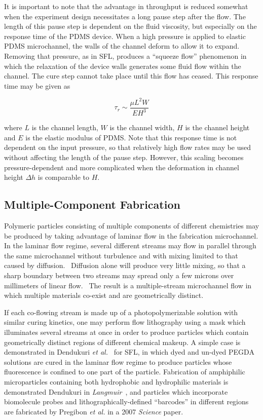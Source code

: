 It is important to note 
that the advantage in throughput is reduced somewhat when the experiment design necessitates a long pause step
after the flow. The length of this pause step is dependent on the fluid viscosity, but especially on the 
response time of the PDMS device.  When a high pressure is applied to elastic PDMS microchannel, the 
walls of the channel deform to allow it to expand.  Removing that pressure, as in SFL, produces a ``squeeze flow''
phenomenon in which the relaxation of the device walls generates some fluid flow within the channel. The cure step 
cannot take place until this flow has ceased.  This response time may be given as

\begin{equation}
\tau_r \sim \frac{\mu L^2 W}{EH^3}
\label{eq:resp-time}
\end{equation}

where $L$ is the channel length, $W$ is the channel width, $H$ is the channel height and $E$ is the elastic
modulus of PDMS.  Note that this response time is not dependent on the input pressure, so that relatively high
flow rates may be used without affecting the length of the pause step. However, this scaling becomes pressure-dependent
and more complicated when the deformation in channel height $\Delta h$ is comparable to $H$.~\cite{dendukuri-sfl}

\subsection{Multiple-Component Fabrication}

Polymeric particles consisting of multiple components of different chemistries may be produced by taking advantage
of laminar flow in the fabrication microchannel.  
In the laminar flow regime, several different streams may flow in parallel through
the same microchannel without turbulence and with mixing limited to that caused by 
diffusion.~\cite{stone-laminar}  Diffusion alone
will produce very little mixing, so that a sharp boundary between two streams may spread only a few microns over
millimeters of linear flow.~\cite{mohr-flow} The result is a multiple-stream microchannel flow in which multiple materials
co-exist and are geometrically distinct.

If each co-flowing stream is made up of a photopolymerizable solution with similar curing kinetics, one may perform
flow lithography using a mask which illuminates several streams at once in order
to produce particles which contain geometrically
distinct regions of different chemical makeup.  A simple case 
is demonstrated in Dendukuri \textit{et al.}~\cite{dendukuri-sfl}
for SFL, in which dyed and un-dyed PEGDA solutions are cured in the laminar flow regime to produce particles whose
fluorescence is confined to one part of the particle.  Fabrication of amphiphilic microparticles containing both
hydrophobic and hydrophilic materials is demonstrated Dendukuri in 
\textit{Langmuir}~\cite{dendukuri-amph}, and particles which incorporate biomolecule probes and lithographically-defined
``barcodes'' in different regions are fabricated by Pregibon \textit{et al.} in a 2007 
\textit{Science} paper.~\cite{pregibon-dna}


